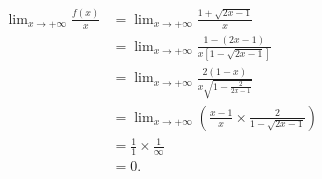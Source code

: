 \documentclass[12pt,a4paper]{article}
\begin{document}
\begin{enumerate}
\begin{enumerate}
                    \(
                    \begin{aligned}
                        \lim_{x \to +\infty} \frac{f(x)}{x} & = \lim_{x \to +\infty} \frac{1 + \sqrt{2x - 1}}{x}                                   \\
                                                            & = \lim_{x \to +\infty} \frac{1 - (2x - 1)}{x \left[ 1 - \sqrt{2x - 1} \right]}       \\
                                                            & = \lim_{x \to +\infty} \frac{2(1 - x)}{x \sqrt{1 - \frac{2}{2x - 1}}}                \\
                                                            & = \lim_{x \to +\infty} \left( \frac{x - 1}{x} \times \frac{2}{1-\sqrt{2x-1}} \right) \\
                                                            & = \frac{1}{1} \times \frac{1}{\infty}                                                \\
                                                            & = 0.
                    \end{aligned}
                    \)


\end{enumerate}
\end{enumerate}
\end{document}
